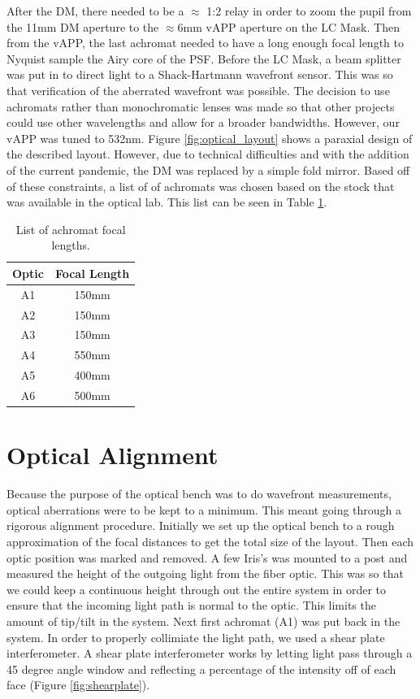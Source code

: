 After the DM, there needed to be a $\approx$ 1:2 relay in order to zoom the pupil from the 11mm DM aperture to the $\approx 6$mm vAPP aperture on the LC Mask.  Then from the vAPP, the last achromat needed to have a long enough focal length to Nyquist sample the Airy core of the PSF.  Before the LC Mask, a beam splitter was put in to direct light to a Shack-Hartmann wavefront sensor.  This was so that verification of the aberrated wavefront was possible.  The decision to use achromats rather than monochromatic lenses was made so that other projects could use other wavelengths and allow for a broader bandwidths.  However, our vAPP was tuned to 532nm.  Figure \ref{fig:optical_layout} shows a paraxial design of the described layout.  However, due to technical difficulties and with the addition of the current pandemic, the DM was replaced by a simple fold mirror.  Based off of these constraints, a list of of achromats was chosen based on the stock that was available in the optical lab.  This list can be seen in Table \ref{tab:achromats}.


\begin{table}[H]
\centering
\begin{tabular}{|c|c|}
\hline
\textbf{Optic} & \textbf{Focal Length} \\ \hline
A1             & 150mm                 \\ \hline
A2             & 150mm                 \\ \hline
A3             & 150mm                 \\ \hline
A4             & 550mm                 \\ \hline
A5             & 400mm                 \\ \hline
A6             & 500mm                 \\ \hline
\end{tabular}
\caption{List of achromat focal lengths.}
\label{tab:achromats}
\end{table}


\section{Optical Alignment}

Because the purpose of the optical bench was to do wavefront measurements, optical aberrations were to be kept to a minimum.  This meant going through a rigorous alignment procedure.  Initially we set up the optical bench to a rough approximation of the focal distances to get the total size of the layout.  Then each optic position was marked and removed.  A few Iris's was mounted to a post and measured the height of the outgoing light from the fiber optic.  This was so that we could keep a continuous height through out the entire system in order to ensure that the incoming light path is normal to the optic.  This limits the amount of tip/tilt in the system.  Next first achromat (A1) was put back in the system.  In order to properly collimiate the light path, we used a shear plate interferometer.  A shear plate interferometer works by letting light pass through a 45 degree angle window and reflecting a percentage of the intensity off of each face (Figure \ref{fig:shearplate}).

